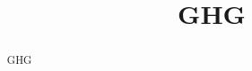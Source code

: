 \documentclass[11pt,twocolumn]{article}
\begin{document}
\title{GHG}
\maketitle{}
\begin{abstract}GHG
\end{abstract}
\begin{quote}\end{quote}  \mdash{}  
\vspace{1em}


\end{document}
